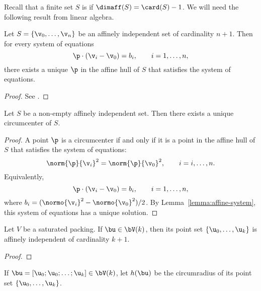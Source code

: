 Recall that a finite set $S$
is  if $\dimaff(S) = \card(S) -1$.
We will need the following result from linear algebra.

\begin{lemma}\label{lemma:affine-system}
Let $S=\{\v_0,\ldots,\v_n\}$ be an affinely independent set of cardinality $n+1$.
Then for every system of equations
\begin{displaymath}
\p \cdot (\v_i - \v_0) = b_i,\qquad i=1,\ldots,n,
\end{displaymath}
there exists a unique $\p$ in the affine hull of $S$ that satisfies the system of equations.
\end{lemma}

\begin{proof} See \cite{XX}.
\end{proof}

\begin{lemma} 
Let $S$ be a non-empty affinely independent set.  Then there exists a unique
circumcenter of $S$.
\end{lemma}

\begin{proof}
A point $\p$ is a circumcenter if and only if it is a point in the affine hull of $S$
that satisfies the system of equations:
\begin{displaymath}
\norm{\p}{\v_i}^2 = \norm{\p}{\v_0}^2,\qquad i = i,\ldots,n.
\end{displaymath}
Equivalently,
\begin{displaymath}
\p\cdot (\v_i-\v_0) = b_i,\qquad i=1,\ldots,n,
\end{displaymath}
where $b_i = (\normo{\v_i}^2-\normo{\v_0}^2)/2$.  By
Lemma~\ref{lemma:affine-system}, this system of equations has a unique
solution.
\end{proof}

\begin{lemma}
Let $V$ be a saturated packing.
If $\bu\in \bV(k)$, then its point set $\{\u_0,\ldots,\u_k\}$ 
is affinely independent of cardinality $k+1$.
\end{lemma}

\begin{proof}
\end{proof}


\begin{definition}[h]
If $\bu=[\u_0;\u_0;\ldots;\u_k]\in \bV(k)$, let $h(\bu)$ be the
circumradius of its point set $\{ \u_0,\ldots, \u_k\}$.
\end{definition}
%

